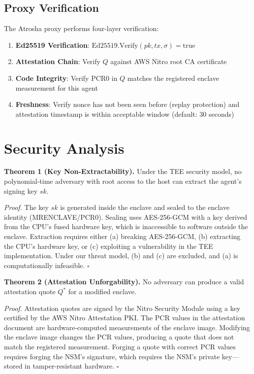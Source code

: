 \documentclass[conference]{IEEEtran}
\begin{document}
\subsection{Proxy Verification}

The Atrosha proxy performs four-layer verification:

\begin{enumerate}
    \item \textbf{Ed25519 Verification}: $\text{Ed25519.Verify}(pk, tx, \sigma) = \text{true}$
    \item \textbf{Attestation Chain}: Verify $Q$ against AWS Nitro root CA certificate
    \item \textbf{Code Integrity}: Verify PCR0 in $Q$ matches the registered enclave measurement for this agent
    \item \textbf{Freshness}: Verify nonce has not been seen before (replay protection) and attestation timestamp is within acceptable window (default: 30 seconds)
\end{enumerate}

\section{Security Analysis}

\textbf{Theorem 1 (Key Non-Extractability).} Under the TEE security model, no polynomial-time adversary with root access to the host can extract the agent's signing key $sk$.

\textit{Proof.} The key $sk$ is generated inside the enclave and sealed to the enclave identity (MRENCLAVE/PCR0). Sealing uses AES-256-GCM with a key derived from the CPU's fused hardware key, which is inaccessible to software outside the enclave. Extraction requires either (a) breaking AES-256-GCM, (b) extracting the CPU's hardware key, or (c) exploiting a vulnerability in the TEE implementation. Under our threat model, (b) and (c) are excluded, and (a) is computationally infeasible. \hfill $\square$

\textbf{Theorem 2 (Attestation Unforgability).} No adversary can produce a valid attestation quote $Q^*$ for a modified enclave.

\textit{Proof.} Attestation quotes are signed by the Nitro Security Module using a key certified by the AWS Nitro Attestation PKI. The PCR values in the attestation document are hardware-computed measurements of the enclave image. Modifying the enclave image changes the PCR values, producing a quote that does not match the registered measurement. Forging a quote with correct PCR values requires forging the NSM's signature, which requires the NSM's private key---stored in tamper-resistant hardware. \hfill $\square$
\end{document}
